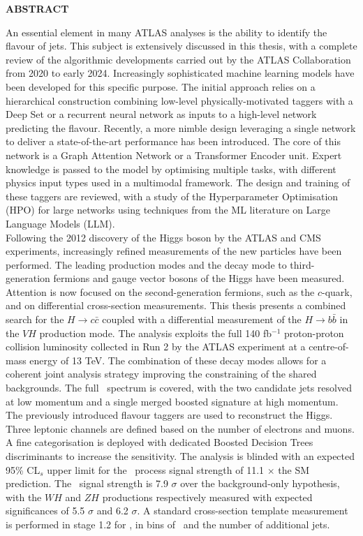 
\vspace*{\fill}
\begin{center}
\textbf{\large \color{oxfordblue} ABSTRACT}
\end{center}
An essential element in many ATLAS analyses is the ability to identify the flavour of jets. This subject is extensively discussed in this thesis, with a complete review of the algorithmic developments carried out by the ATLAS Collaboration from 2020 to early 2024. Increasingly sophisticated machine learning models have been developed for this specific purpose. The initial approach relies on a hierarchical construction combining low-level physically-motivated taggers with a Deep Set or a recurrent neural network as inputs to a high-level network predicting the flavour. Recently, a more nimble design leveraging a single network to deliver a state-of-the-art performance has been introduced. The core of this network is a Graph Attention Network or a Transformer Encoder unit. Expert knowledge is passed to the model by optimising multiple tasks, with different physics input types used in a multimodal framework. The design and training of these taggers are reviewed, with a study of the Hyperparameter Optimisation (HPO) for large networks using techniques from the ML literature on Large Language Models (LLM). \\

Following the 2012 discovery of the Higgs boson by the ATLAS and CMS experiments, increasingly refined measurements of the new particles have been performed. The leading production modes and the decay mode to third-generation fermions and gauge vector bosons of the Higgs have been measured. Attention is now focused on the second-generation fermions, such as the $c$-quark, and on differential cross-section measurements. This thesis presents a combined search for the $H \rightarrow c\bar{c}$ coupled with a differential measurement of the $H \rightarrow b\bar{b}$ in the $VH$ production mode. The analysis exploits the full 140 fb$^{-1}$ proton-proton collision luminosity collected in Run 2 by the ATLAS experiment at a centre-of-mass energy of 13 TeV. The combination of these decay modes allows for a coherent joint analysis strategy improving the constraining of the shared backgrounds. The full \pt\ spectrum is covered, with the two candidate jets resolved at low momentum and a single merged boosted signature at high momentum. The previously introduced flavour taggers are used to reconstruct the Higgs. Three leptonic channels are defined based on the number of electrons and muons. A fine categorisation is deployed with dedicated Boosted Decision Trees discriminants to increase the sensitivity. The analysis is blinded with an expected 95\% CL$_s$ upper limit for the \vhc\ process signal strength of 11.1 $\times$ the SM prediction. The \vhb\ signal strength is 7.9 $\sigma$ over the background-only hypothesis, with the $WH$ and $ZH$ productions respectively measured with expected significances of 5.5 $\sigma$ and 6.2 $\sigma$. A standard cross-section template measurement is performed in stage 1.2 for \vhb, in bins of \pt\ and the number of additional jets.
\vspace*{\fill}
    